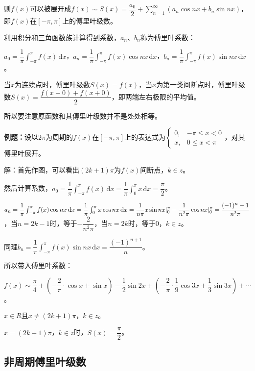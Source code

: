 \documentclass[UTF8, 12pt]{ctexart}
\begin{document}
        则$f(x)$可以被展开成$f(x)\sim S(x)=\dfrac{a_0}{2}+\sum\limits_{n=1}^\infty(a_n\cos nx+b_n\sin nx)$，即$f(x)$在$[-\pi,\pi]$上的傅里叶级数。

        利用积分和三角函数族计算得到系数，$a_n$、$b_n$称为傅里叶系数：

        $a_0=\dfrac{1}{\pi}\int_{-\pi}^\pi f(x)\,\textrm{d}x$，$a_n=\dfrac{1}{\pi}\int_{-\pi}^\pi f(x)\cos nx\,\textrm{d}x$，$b_n=\dfrac{1}{\pi}\int_{-\pi}^\pi f(x)\sin nx\,\textrm{d}x$。

        当$x$为连续点时，傅里叶级数$S(x)=f(x)$，当$x$为第一类间断点时，傅里叶级数$S(x)=\dfrac{f(x-0)+f(x+0)}{2}$，即两端左右极限的平均值。

        所以要注意原函数和其傅里叶级数并不是处处相等。

        \textbf{例题：}设以$2\pi$为周期的$f(x)$在$[-\pi,\pi]$上的表达式为$\left\{\begin{array}{ll}
                                                                                    0, & -\pi\leqslant x<0 \\
                                                                                    x, & 0\leqslant x<\pi
        \end{array}\right.$，对其傅里叶展开。

        解：首先作图，可以看出$(2k+1)\pi$为$f(x)$间断点，$k\in z$。

        然后计算系数，$a_0=\dfrac{1}{\pi}\int_{-\pi}^\pi f(x)\,\textrm{d}x=\dfrac{1}{\pi}\int_0^\pi x\,\textrm{d}x=\dfrac{\pi}{2}$。

        $a_n=\dfrac{1}{\pi}\int_{-\pi}^\pi f(x)\cos nx\,\textrm{d}x=\dfrac{1}{\pi}\int_0^\pi x\cos nx\,\textrm{d}x=\dfrac{1}{n\pi}x\sin nx\vert_0^\pi-\dfrac{1}{n^2\pi}\cos nx\vert_0^\pi\\=\dfrac{(-1)^n-1}{n^2\pi}$，当$n=2k-1$时，等于$-\dfrac{2}{n^2\pi}$，当$n=2k$时，等于0，$k\in z$。

        同理$b_n=\dfrac{1}{\pi}\int_{-\pi}^\pi f(x)\sin nx\,\textrm{d}x=\dfrac{(-1)^{n+1}}{n}$。

        所以带入傅里叶系数：

        $f(x)\sim\dfrac{\pi}{4}+\left(-\dfrac{2}{\pi}\cdot\cos x+\sin x\right)-\dfrac{1}{2}\sin2x+\left(-\dfrac{2}{\pi}\cdot\dfrac{1}{9}\cos3x+\dfrac{1}{3}\sin3x\right)+\cdots$。

        $x\in R$且$x\neq(2k+1)\pi$，$k\in z$。

        $x=(2k+1)\pi$，$k\in z$时，$S(x)=\dfrac{\pi}{2}$。

        \subsection{非周期傅里叶级数}
\end{document}
